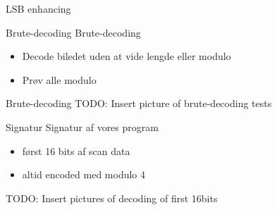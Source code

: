 \begin{frame}{LSB enhancing}
\begin{figure}
\centering
{}
\end{figure}
\end{frame}

\begin{frame}{Brute-decoding}
	Brute-decoding
		\begin{itemize}
		\item Decode biledet uden at vide lengde eller modulo
		\item Prøv alle modulo
		\end{itemize}
\end{frame}

\begin{frame}{Brute-decoding}
TODO: Insert picture of brute-decoding tests
\end{frame}

\begin{frame}{Signatur}
	Signatur af vores program
		\begin{itemize}
		\item først 16 bits af scan data
		\item altid encoded med modulo 4
		\end{itemize}
\end{frame}

\begin{frame}
TODO: Insert pictures of decoding of first 16bits
\end{frame}